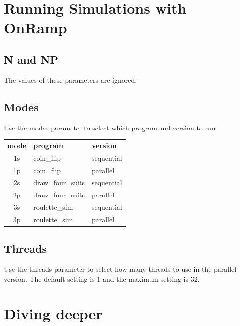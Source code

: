 \documentclass[a4paper, 11pt]{article}
\begin{document}
\section{Running Simulations with OnRamp}
\subsection{N and NP}
The values of these parameters are ignored.

\pagebreak
\subsection{Modes}
Use the modes parameter to select which program and version to run.

\begin{tabular}{ c l l }
	\textbf{mode} & \textbf{program} & \textbf{version} \\
	1s & coin\_flip & sequential \\
	1p & coin\_flip & parallel \\
	2s & draw\_four\_suits & sequential \\
	2p & draw\_four\_suits & parallel \\
	3s & roulette\_sim & sequential \\
	3p & roulette\_sim & parallel \\
\end{tabular}

\subsection{Threads}
Use the threads parameter to select how many threads to use in the parallel version. The default setting is 1 and the maximum setting is 32.

\section{Diving deeper}
\end{document}
